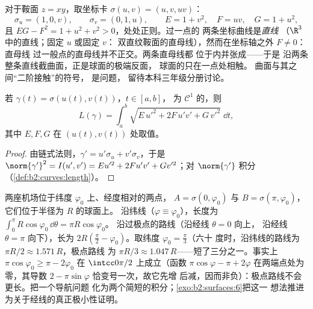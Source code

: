 \begin{example}[鞍面坐标卡]\label{ex:b2:surfaces:saddlechart}
对于鞍面 $z = xy$，取坐标卡 $\sigma(u, v) = (u, v,
uv)$：
\[
\sigma_u = (1, 0, v), \qquad \sigma_v = (0, 1, u),
\qquad
E = 1 + v^2, \quad F = uv, \quad G = 1 + u^2 ,
\]
且 $EG - F^2 = 1 + u^2 + v^2 > 0$，处处正则。过一点的
两条坐标曲线是\emph{直线
}（$\R^3$ 中的直线；固定 $u$ 或固定 $v$：
双直纹鞍面的直母线），然而在坐标轴之外 $F \neq 0$：直母线
过一般点的直母线并不正交。两条直母线都
位于内并张成——于是
沿两条整条直线截曲面，正是球面的极端反面，
球面的只在一点处相触。
曲面与其之间“二阶接触”的符号，
是问题，
留待本科三年级分册讨论。
\end{example}

\begin{proposition}[曲面上所画曲线的
长度]\label{prop:b2:surfaces:curvelength}
若 $\gamma(t) = \sigma(u(t), v(t))$，$t \in [a, b]$，
为 $\mathcal{C}^1$ 的，则
\[
L(\gamma) = \int_a^b
\sqrt{E\,u'^2 + 2F\,u'v' + G\,v'^2}\;\dd t ,
\]
其中 $E, F, G$ 在 $(u(t), v(t))$ 处取值。
\end{proposition}

\begin{proof}
由链式法则，$\gamma' = u'\sigma_u + v'\sigma_v$，于是
$\norm{\gamma'}^2 = I(u', v') = Eu'^2 + 2Fu'v' + Gv'^2$；对
$\norm{\gamma'}$ 积分（\cref{def:b2:curves:length}）。
\end{proof}

\begin{example}[为何客机飞越极点]\label{ex:b2:surfaces:polarroute}
两座机场位于纬度 $\varphi_0$ 上、经度相对的两点，
$A = \sigma(0, \varphi_0)$ 与 $B = \sigma(\pi,
\varphi_0)$，它们位于半径为 $R$ 的球面上。
沿纬线（$\varphi \equiv \varphi_0$），长度为
$\int_0^\pi R\cos\varphi_0\,\dd\theta = \pi R\cos\varphi_0$。
沿过极点的路线（沿经线 $\theta = 0$ 向上，
沿经线 $\theta = \pi$ 向下），长为 $2R(\frac\pi2 -
\varphi_0)$。取纬度 $\varphi_0 = \frac\pi3$（六十
度时，沿纬线的路线为 $\pi R/2 \approx 1.571\,R$，极点路线
为 $\pi R/3 \approx 1.047\,R$——短了三分之一。事实上
$\pi\cos\varphi_0 \geq \pi - 2\varphi_0$ 在
$\intcc0{\pi/2}$ 上成立（函数 $\pi\cos\varphi - \pi +
2\varphi$ 在两端点处为零，其导数 $2 -
\pi\sin\varphi$ 恰变号一次，故它先增
后减，因而非负）：极点路线不会
更长。把一个导航问题
化为两个简短的积分；\cref{exo:b2:surfaces:6}把这一
想法推进为关于经线的真正极小性证明。
\end{example}

